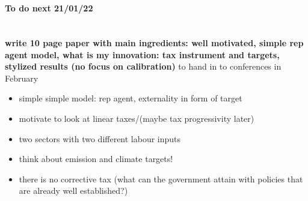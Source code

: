 \section{}\label{sec:rm}

\paragraph{To do next 21/01/22}
\ \\
\textbf{write 10 page paper with main ingredients: well motivated, simple rep agent model, what is my innovation: tax instrument and targets, stylized results (no focus on calibration)} \ar to hand in to conferences in February
\begin{itemize}
	\item simple simple model: rep agent, externality in form of target
	\item motivate to look at linear taxes/(maybe tax progressivity later)
	\item two sectors with two different labour inputs
	\item think about emission and climate targets! 
	\item there is no corrective tax (what can the government attain with policies that are already well established?)
\end{itemize}
